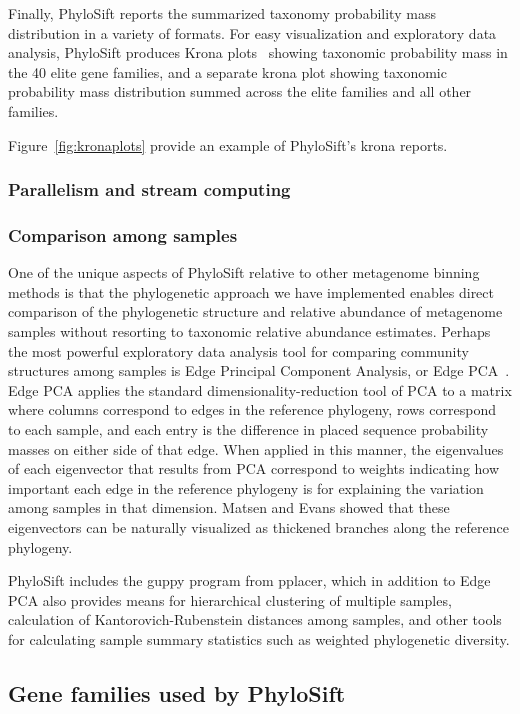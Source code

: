 \documentclass[10pt]{article}
\begin{document}
Finally, PhyloSift reports the summarized taxonomy probability mass distribution in a variety of formats.
For easy visualization and exploratory data analysis, PhyloSift produces Krona plots~\cite{krona} showing taxonomic probability mass in the 40 elite gene families, and a separate krona plot showing taxonomic probability mass distribution summed across the elite families and all other families.

Figure~\ref{fig:kronaplots} provide an example of PhyloSift's krona reports.

\subsubsection*{Parallelism and stream computing}

\subsubsection*{Comparison among samples}

One of the unique aspects of PhyloSift relative to other metagenome binning methods is that the phylogenetic approach we have implemented enables direct comparison of the phylogenetic structure and relative abundance of metagenome samples without resorting to taxonomic relative abundance estimates.
Perhaps the most powerful exploratory data analysis tool for comparing community structures among samples is Edge Principal Component Analysis, or Edge PCA~\cite{Matsen2012}.
Edge PCA applies the standard dimensionality-reduction tool of PCA to a matrix where columns correspond to edges in the reference phylogeny, rows correspond to each sample, and each entry is the difference in placed sequence probability masses on either side of that edge.
When applied in this manner, the eigenvalues of each eigenvector that results from PCA correspond to weights indicating how important each edge in the reference phylogeny is for explaining the variation among samples in that dimension.
Matsen and Evans showed that these eigenvectors can be naturally visualized as thickened branches along the reference phylogeny.

PhyloSift includes the guppy program from pplacer, which in addition to Edge PCA also provides means for hierarchical clustering of multiple samples, calculation of Kantorovich-Rubenstein distances among samples, and other tools for calculating sample summary statistics such as weighted phylogenetic diversity.

\subsection*{Gene families used by PhyloSift}
\end{document}
